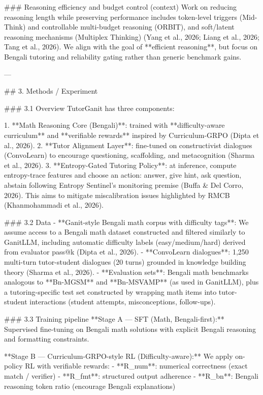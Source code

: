 ### Reasoning efficiency and budget control (context)  
Work on reducing reasoning length while preserving performance includes token-level triggers (Mid-Think) and controllable multi-budget reasoning (ORBIT), and soft/latent reasoning mechanisms (Multiplex Thinking) (Yang et al., 2026; Liang et al., 2026; Tang et al., 2026). We align with the goal of **efficient reasoning**, but focus on Bengali tutoring and reliability gating rather than generic benchmark gains.

---

## 3. Methods / Experiment  

### 3.1 Overview  
TutorGanit has three components:

1. **Math Reasoning Core (Bengali)**: trained with **difficulty-aware curriculum** and **verifiable rewards** inspired by Curriculum-GRPO (Dipta et al., 2026).  
2. **Tutor Alignment Layer**: fine-tuned on constructivist dialogues (ConvoLearn) to encourage questioning, scaffolding, and metacognition (Sharma et al., 2026).  
3. **Entropy-Gated Tutoring Policy**: at inference, compute entropy-trace features and choose an action: {answer, give hint, ask question, abstain} following Entropy Sentinel’s monitoring premise (Buffa & Del Corro, 2026). This aims to mitigate miscalibration issues highlighted by RMCB (Khanmohammadi et al., 2026).

### 3.2 Data  
- **Ganit-style Bengali math corpus with difficulty tags**: We assume access to a Bengali math dataset constructed and filtered similarly to GanitLLM, including automatic difficulty labels (easy/medium/hard) derived from evaluator pass@k (Dipta et al., 2026).  
- **ConvoLearn dialogues**: 1,250 multi-turn tutor-student dialogues (20 turns) grounded in knowledge building theory (Sharma et al., 2026).  
- **Evaluation sets**: Bengali math benchmarks analogous to **Bn-MGSM** and **Bn-MSVAMP** (as used in GanitLLM), plus a tutoring-specific test set constructed by wrapping math items into tutor-student interactions (student attempts, misconceptions, follow-ups).

### 3.3 Training pipeline  
**Stage A — SFT (Math, Bengali-first):**  
Supervised fine-tuning on Bengali math solutions with explicit Bengali reasoning and formatting constraints.

**Stage B — Curriculum-GRPO-style RL (Difficulty-aware):**  
We apply on-policy RL with verifiable rewards:
- **R_num**: numerical correctness (exact match / verifier)  
- **R_fmt**: structured output adherence  
- **R_bn**: Bengali reasoning token ratio (encourage Bengali explanations)  

